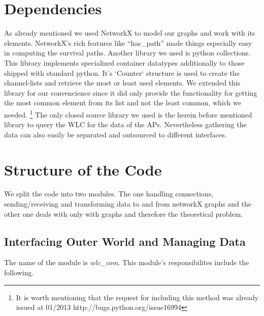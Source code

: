  \section{Dependencies}
    As already mentioned we used NetworkX\cite{hagberg-2008-exploring} to model our graphs and work with its elements.
    NetworkX's rich features like ``has\_path'' made things especially easy in computing the survival paths.
    Another library we used is python collections. \cite{python_collections}
    This library implements specialized container datatypes additionally to those shipped with standard python.
    It's `Counter` structure is used to create the channel-lists and retrieve the most or least used elements.
    We extended this library for our convencience since it did only provide the functionality for getting the most common element from its list and not the least common,
    which we needed. \footnote{It is worth mentioning that the request for including this method was already issued at 01/2013 http://bugs.python.org/issue16994}
    The only closed source library we used is the herein before mentioned library to query the WLC for the data of the APs. Nevertheless gathering the data can also
    easily be separated and outsourced to different interfaces.
  
  \section{Structure of the Code}
    We split the code into two modules. The one handling connections, sending/receiving and transforming data to and from networkX graphs and the other one 
    deals with only with graphs and therefore the theoretical problem.
    
    \subsection{Interfacing Outer World and Managing Data}
      The name of the module is \textit{wlc\_com}. This module's responsibilites include the following.
      
